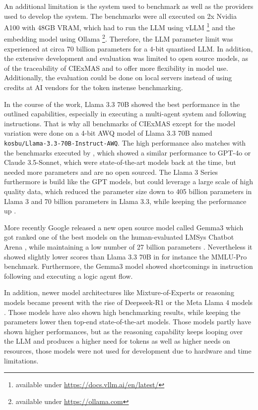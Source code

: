 \documentclass[a4paper,oneside,bibliography=totoc]{scrbook}
\begin{document}
An additional limitation is the system used to benchmark as well as the providers used to develop the system. The benchmarks were all executed on 2x Nvidia A100 with 48GB VRAM, which had to run the \ac{LLM} using vLLM \footnote{available under \url{https://docs.vllm.ai/en/latest/}} and the embedding model using Ollama \footnote{available under \url{https://ollama.com}}. Therefore, the \ac{LLM} parameter limit was experienced at circa 70 billion parameters for a 4-bit quantised \ac{LLM}. In addition, the extensive development and evaluation was limited to open source models, as of the traceability of CIExMAS and to offer more flexibility in model use. Additionally, the evaluation could be done on local servers instead of using credits at AI vendors for the token instense benchmarking.

In the course of the work, Llama 3.3 70B showed the best performance in the outlined capabilities, especially in executing a multi-agent system and following instructions. That is why all benchmarks of CIExMAS except for the model variation were done on a 4-bit AWQ model of Llama 3.3 70B named \texttt{kosbu/Llama-3.3-70B-Instruct-AWQ}. The high performance also matches with the benchmarks executed by \citet{Meta2024}, which showed a similar performance to GPT-4o or Claude 3.5-Sonnet, which were state-of-the-art models back at the time, but needed more parameters and are no open sourced. The Llama 3 Series furthermore is build like the GPT models, but could leverage a large scale of high quality data, which reduced the parameter size down to 405 billion parameters in Llama 3 and 70 billion parameters in Llama 3.3, while keeping the performance up \cite{Grattafiori2024,Meta2024}.

More recently Google released a new open source model called Gemma3 which got ranked one of the best models on the human-evaluated LMSys Chatbot Arena \cite{Chiang2024}, while maintaining a low number of 27 billion parameters \cite{Team2025}. Nevertheless it showed slightly lower scores than Llama 3.3 70B in for instance the MMLU-Pro benchmark. Furthermore, the Gemma3 model showed shortcomings in instruction following and executing a logic agent flow.

In addition, newer model architectures like Mixture-of-Experts or reasoning models became present with the rise of Deepseek-R1 or the Meta Llama 4 models \cite{DeepSeekAI2025,MetaAI2025}. Those models have also shown high benchmarking results, while keeping the parameters lower then top-end state-of-the-art models. Those models partly have shown higher performances, but as the reasoning capability keeps looping over the LLM and produces a higher need for tokens as well as higher needs on resources, those models were not used for development due to hardware and time limitations.
\end{document}
